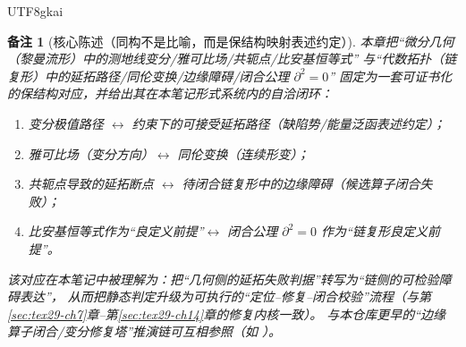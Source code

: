 \documentclass[12pt]{article}
\newtheorem{remark}{备注}[section]
\newcommand{\KouJing}{\texorpdfstring{表述约定}{表述约定}}
\begin{document}
\begin{CJK*}{UTF8}{gkai}
\begin{remark}[核心陈述（同构不是比喻，而是保结构映射\KouJing）]
本章把“微分几何（黎曼流形）中的测地线变分/雅可比场/共轭点/比安基恒等式”
与“代数拓扑（链复形）中的延拓路径/同伦变换/边缘障碍/闭合公理 $\partial^2=0$”
固定为一套\emph{可证书化的保结构对应}，并给出其在本笔记形式系统内的自洽闭环：
\begin{enumerate}
  \item 变分极值路径 $\leftrightarrow$ 约束下的可接受延拓路径（缺陷势/能量泛函\KouJing）；
  \item 雅可比场（变分方向）$\leftrightarrow$ 同伦变换（连续形变）；
  \item 共轭点导致的延拓断点 $\leftrightarrow$ 待闭合链复形中的边缘障碍（候选算子闭合失败）；
  \item 比安基恒等式作为“良定义前提”$\leftrightarrow$ 闭合公理 $\partial^2=0$ 作为“链复形良定义前提”。
\end{enumerate}
该对应在本笔记中被理解为：把“几何侧的延拓失败判据”转写为“链侧的可检验障碍表达”，
从而把静态判定升级为可执行的“定位--修复--闭合校验”流程（与第\ref{sec:tex29-ch7}章--第\ref{sec:tex29-ch14}章的修复内核一致）。
与本仓库更早的“边缘算子闭合/变分修复塔”推演链可互相参照（如 \cite{RepoNB17EdgeOperator}）。
\end{remark}


\end{CJK*}
\end{document}
